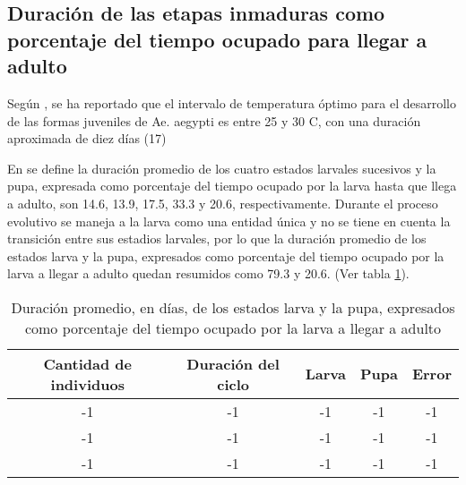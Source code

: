 \subsection{Duración de las etapas inmaduras como porcentaje del tiempo ocupado para llegar a adulto}

Según \cite{manrique1998desarrollo}, se ha reportado que el intervalo de temperatura óptimo para el
desarrollo de las formas juveniles de Ae. aegypti es entre 25 y 30 C, con una duración aproximada de
diez días (17) 

En \cite{dengueUruguayCap2} se define la duración promedio de los cuatro estados larvales sucesivos y la
pupa, expresada como porcentaje del tiempo ocupado por la larva hasta que llega a adulto, son 14.6, 13.9,
17.5, 33.3 y 20.6, respectivamente. Durante el proceso evolutivo se maneja a la larva como una entidad
única y no se tiene en cuenta la transición entre sus estadios larvales, por lo que la duración promedio
de los estados larva y la pupa, expresados como porcentaje del tiempo ocupado por la larva a llegar a
adulto quedan resumidos como 79.3 y 20.6. (Ver tabla \ref{tab:desarrollo-ciclo-distribucion-test}).

\begin{table}
\begin{center}
\begin{tabular}{c c c c c }
Cantidad de individuos & Duración del ciclo & Larva & Pupa  & Error\\
\hline
-1   & -1 & -1 & -1 & -1   \\
-1   & -1 & -1 & -1 & -1   \\
-1   & -1 & -1 & -1 & -1   \\
\end{tabular}
\caption{ \label{tab:desarrollo-ciclo-distribucion-test} Duración promedio, en días, de los estados larva
y la pupa, expresados como porcentaje del tiempo ocupado por la larva a llegar a adulto}
\end{center}
\end{table}
